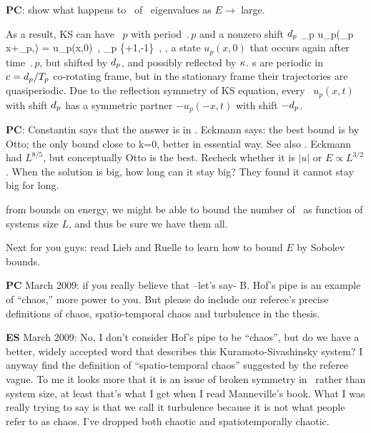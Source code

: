 {\bf PC}: show what happens to \eqva\ of \eqva\ eigenvalues
as $E \to $ large.

\bigskip

As a result, KS can have
\rpo\ $p$ with period $\period{p}$ and
a nonzero shift $d_p$
\beq
\sigma_p u_p(\sigma_p x+\shift_p,) = u_p(x,0)
\,,\qquad
\sigma_p \in \{+1,-1\}
\,,
\ie, a state $u_p(x,0)$ that occurs again after time $\period{p}$,
but shifted by $d_p$, and possibly reflected by $\kappa$.
{\Rpo s} are periodic in $c=d_p/{T_{p}}$
co-rotating frame,
but in the stationary frame their trajectories
are quasiperiodic.
Due to the reflection symmetry  of KS equation,
every \rpo\
$u_p(x,t)$ with shift $d_p$ has a symmetric partner
$-u_p(-x,t)$ with shift $-d_p$.

%
{\bf PC}:
  Constantin says that the answer is in
    . Eckmann says: the  best bound is by Otto; the
    only bound close to k=0, better in essential way. See also \refref{bronski-2005}.
    Eckmann had $L^{8/5}$, but conceptually Otto is the best. Recheck whether it is
    $|u|$ or $E \propto L^{3/2}$.
    When the solution is big, how long can it stay big? They found it cannot stay big for
    long.



from bounds on energy, we might be able
to bound the number of \eqva\ as function of systems size $L$, and thus
be sure we have them all.

Next for you guys: read Lieb and Ruelle to learn
    how to bound $E$  by Sobolev bounds.

{\bf PC} March 2009:
if you really believe that --let's say- B. Hof's pipe is an example of ``chaos,'' more
    power to you. But please do include our referee's precise definitions of
    chaos, spatio-temporal chaos and turbulence in the thesis.

{\bf ES} March 2009: No, I don't consider Hof's pipe to be ``chaos'',
		but do we have a better, widely accepted word
		that describes this Kuramoto-Sivashinsky system? I anyway
		find the definition of ``spatio-temporal chaos'' suggested
		by the referee vague. To me it looks more that it is an issue
		of broken symmetry in \KS\ rather than system size,
		at least that's what I get when I read Manneville's book.
		What I was really trying to
		say is that we call it turbulence because it is not
		what people refer to as chaos. I've dropped both chaotic
		and spatiotemporally chaotic.

